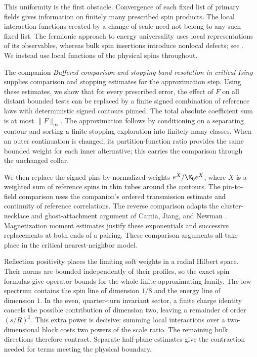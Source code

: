 This uniformity is the first obstacle. Convergence of each fixed list
of primary fields gives information on finitely many prescribed spin
products. The local interaction functions created by a change of scale
need not belong to any such fixed list. The fermionic approach to energy
universality uses local representations of its observables, whereas
bulk spin insertions introduce nonlocal defects; see
\cite{GGM2012,AGG2023}. We instead use local functions of the physical
spins throughout.

The companion \emph{Buffered comparison and stopping-band resolution
in critical Ising} \cite{IsingToolkit} supplies comparison and stopping
estimates for the approximation step. Using these estimates, we show
that for every prescribed error, the effect of $F$ on all distant
bounded tests can be replaced by a finite signed combination of reference
laws with deterministic signed contours pinned. The total absolute
coefficient sum is at most $\|F\|_\infty$. The approximation follows by
conditioning on a separating contour and sorting a finite stopping
exploration into finitely many classes. When an outer continuation is
changed, its partition-function ratio provides the same bounded weight
for each inner alternative; this carries the comparison through the
unchanged collar.

We then replace the signed pins by normalized weights $e^X/\E_0e^X$,
where $X$ is a weighted sum of reference spins in thin tubes around the
contours. The pin-to-field comparison uses the companion's ordered
transmission estimate and continuity of reference correlations. The
reverse comparison adapts the cluster-necklace and ghost-attachment
argument of Camia, Jiang, and Newman \cite{CJN2020}. Magnetization moment
estimates \cite{CGN2015} justify these exponentials and successive
replacements at both ends of a pairing. These comparison arguments
all take place in the critical nearest-neighbor model.

Reflection positivity places the limiting soft weights in a radial
Hilbert space. Their norms are bounded independently of their profiles,
so the exact spin formulas give operator bounds for the whole finite
approximating family. The low spectrum contains the spin line of
dimension $1/8$ and the energy line of dimension $1$. In the even,
quarter-turn invariant sector, a finite charge identity cancels the
possible contribution of dimension two, leaving a remainder of order
$(s/R)^3$. This extra power is decisive: summing local interactions over
a two-dimensional block costs two powers of the scale ratio. The
remaining bulk directions therefore contract. Separate half-plane
estimates give the contraction needed for terms meeting the physical
boundary.

